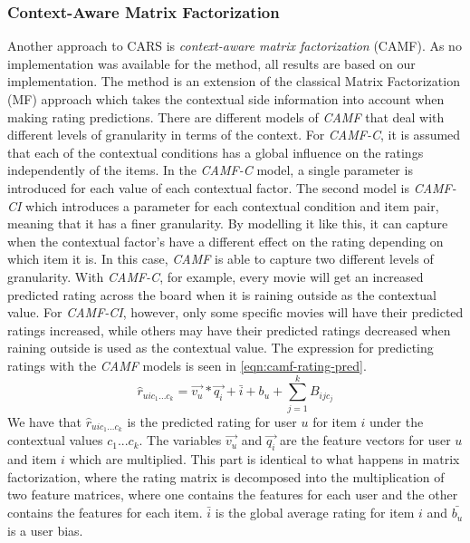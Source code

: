 \subsubsection{Context-Aware Matrix Factorization}\label{subsec:camf}
Another approach to CARS is \textit{context-aware matrix factorization} (CAMF)\cite{baltrunasCAMF}.
As no implementation was available for the method, all results are based on our implementation.
The method is an extension of the classical Matrix Factorization (MF) approach which takes the contextual side information into account when making rating predictions.
There are different models of \textit{CAMF} that deal with different levels of granularity in terms of the context.
For \textit{CAMF-C}, it is assumed that each of the contextual conditions has a global influence on the ratings independently of the items.
In the \textit{CAMF-C} model, a single parameter is introduced for each value of each contextual factor.
The second model is \textit{CAMF-CI} which introduces a parameter for each contextual condition and item pair, meaning that it has a finer granularity.
By modelling it like this, it can capture when the contextual factor's have a different effect on the rating depending on which item it is.
In this case, \textit{CAMF} is able to capture two different levels of granularity.
With \textit{CAMF-C}, for example, every movie will get an increased predicted rating across the board when it is raining outside as the contextual value.
For \textit{CAMF-CI}, however, only some specific movies will have their predicted ratings increased, while others may have their predicted ratings decreased when raining outside is used as the contextual value.
The expression for predicting ratings with the \textit{CAMF} models is seen in \autoref{eqn:camf-rating-pred}.
\begin{equation}
    \label{eqn:camf-rating-pred}
    \hat{r}_{uic_1...c_k} = \vec{v_u} * \vec{q_i} + \bar{i} + b_u + \sum\limits_{j = 1}^k B_{ijc_j}
\end{equation}
We have that $\hat{r}_{uic_1...c_k}$ is the predicted rating for user $u$ for item $i$ under the contextual values $c_1...c_k$.
The variables $\vec{v_u} $ and $ \vec{q_i}$ are the feature vectors for user $u$ and item $i$ which are multiplied.
This part is identical to what happens in matrix factorization, where the rating matrix is decomposed into the multiplication of two feature matrices, where one contains the features for each user and the other contains the features for each item.
$\bar{i}$ is the global average rating for item $i$ and $\bar{b_u}$ is a user bias. 
